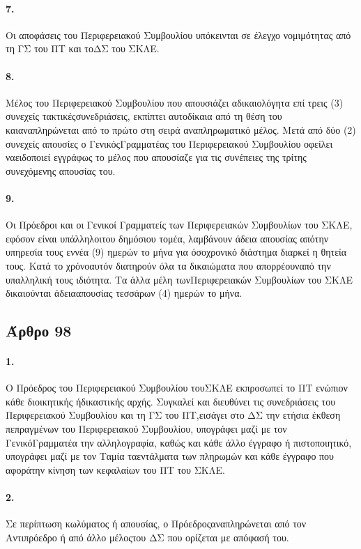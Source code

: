 \documentclass[a4paper,oneside, 10pt]{book}
\begin{document}
\paragraph { 7. } Οι αποφάσεις του Περιφερειακού Συμβουλίου υπόκεινται σε έλεγχο νομιμότητας από τη ΓΣ του ΠΤ και τοΔΣ του ΣΚΛΕ.
\paragraph { 8. } Μέλος του Περιφερειακού Συμβουλίου που απουσιάζει αδικαιολόγητα επί τρεις (3) συνεχείς τακτικέςσυνεδριάσεις, εκπίπτει αυτοδίκαια από τη θέση του καιαναπληρώνεται από το πρώτο στη σειρά αναπληρωματικό μέλος. Μετά από δύο (2) συνεχείς απουσίες ο ΓενικόςΓραμματέας του Περιφερειακού Συμβουλίου οφείλει ναειδοποιεί εγγράφως το μέλος που απουσίαζε για τις συνέπειες της τρίτης συνεχόμενης απουσίας του.
\paragraph { 9. } Οι Πρόεδροι και οι Γενικοί Γραμματείς των Περιφερειακών Συμβουλίων του ΣΚΛΕ, εφόσον είναι υπάλληλοιτου δημόσιου τομέα, λαμβάνουν άδεια απουσίας απότην υπηρεσία τους εννέα (9) ημερών το μήνα για όσοχρονικό διάστημα διαρκεί η θητεία τους. Κατά το χρόνοαυτόν διατηρούν όλα τα δικαιώματα που απορρέουναπό την υπαλληλική τους ιδιότητα. Τα άλλα μέλη τωνΠεριφερειακών Συμβουλίων του ΣΚΛΕ δικαιούνται άδειααπουσίας τεσσάρων (4) ημερών το μήνα.
\subsection*{ Άρθρο 98 }
\paragraph { 1. } Ο Πρόεδρος του Περιφερειακού Συμβουλίου τουΣΚΛΕ εκπροσωπεί το ΠΤ ενώπιον κάθε διοικητικής ήδικαστικής αρχής. Συγκαλεί και διευθύνει τις συνεδριάσεις του Περιφερειακού Συμβουλίου και τη ΓΣ του ΠΤ,εισάγει στο ΔΣ την ετήσια έκθεση πεπραγμένων του Περιφερειακού Συμβουλίου, υπογράφει μαζί με τον ΓενικόΓραμματέα την αλληλογραφία, καθώς και κάθε άλλο έγγραφο ή πιστοποιητικό, υπογράφει μαζί με τον Ταμία ταεντάλματα των πληρωμών και κάθε έγγραφο που αφοράτην κίνηση των κεφαλαίων του ΠΤ του ΣΚΛΕ.
\paragraph { 2. } Σε περίπτωση κωλύματος ή απουσίας, ο Πρόεδροςαναπληρώνεται από τον Αντιπρόεδρο ή από άλλο μέλοςτου ΔΣ που ορίζεται με απόφασή του.
\end{document}
